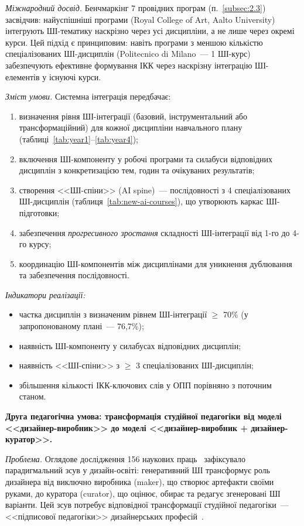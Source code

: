 \textit{Міжнародний досвід.} Бенчмаркінг 7 провідних програм (п.~\ref{subsec:2.3}) засвідчив: найуспішніші програми (Royal College of Art, Aalto University) інтегрують ШІ-тематику наскрізно через усі дисципліни, а не лише через окремі курси. Цей підхід є принциповим: навіть програми з меншою кількістю спеціалізованих ШІ-дисциплін (Politecnico di Milano~--- 1 ШІ-курс) забезпечують ефективне формування ІКК через наскрізну інтеграцію ШІ-елементів у існуючі курси.

\textit{Зміст умови.} Системна інтеграція передбачає:
\begin{enumerate}
    \item визначення рівня ШІ-інтеграції (базовий, інструментальний або трансформаційний) для кожної дисципліни навчального плану (таблиці~\ref{tab:year1}--\ref{tab:year4});
    \item включення ШІ-компоненту у робочі програми та силабуси відповідних дисциплін з конкретизацією тем, годин та очікуваних результатів;
    \item створення <<ШІ-спіни>> (AI spine)~--- послідовності з 4 спеціалізованих ШІ-дисциплін (таблиця~\ref{tab:new-ai-courses}), що утворюють каркас ШІ-підготовки;
    \item забезпечення \textit{прогресивного зростання} складності ШІ-інтеграції від 1-го до 4-го курсу;
    \item координацію ШІ-компонентів між дисциплінами для уникнення дублювання та забезпечення послідовності.
\end{enumerate}

\textit{Індикатори реалізації:}
\begin{itemize}
    \item частка дисциплін з визначеним рівнем ШІ-інтеграції $\geq$ 70\% (у запропонованому плані~--- 76,7\%);
    \item наявність ШІ-компоненту у силабусах відповідних дисциплін;
    \item наявність <<ШІ-спіни>> з $\geq$ 3 спеціалізованих ШІ-дисциплін;
    \item збільшення кількості ІКК-ключових слів у ОПП порівняно з поточним станом.
\end{itemize}

\textbf{Друга педагогічна умова: трансформація студійної педагогіки від моделі <<дизайнер-виробник>> до моделі <<дизайнер-виробник + дизайнер-куратор>>.}

\textit{Проблема.} Оглядове дослідження 156 наукових праць~\cite{Musiienko2026ScopingReview} зафіксувало парадигмальний зсув у дизайн-освіті: генеративний ШІ трансформує роль дизайнера від виключно виробника (maker), що створює артефакти своїми руками, до куратора (curator), що оцінює, обирає та редагує згенеровані ШІ варіанти. Цей зсув потребує відповідної трансформації студійної педагогіки~--- <<підписової педагогіки>> дизайнерських професій~\cite{Shulman2005}.

